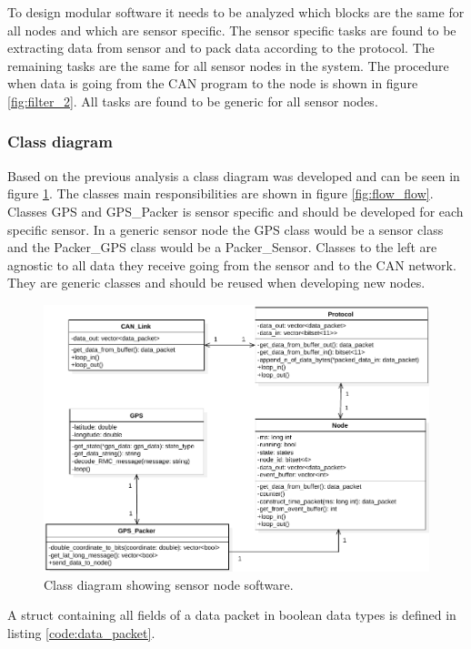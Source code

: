 To design modular software it needs to be analyzed which blocks are the same for all nodes and which are sensor specific.
The sensor specific tasks are found to be extracting data from sensor and to pack data according to the protocol.
The remaining tasks are the same for all sensor nodes in the system. 
The procedure when data is going from the CAN program to the node is shown in figure \ref{fig:filter_2}.
All tasks are found to be generic for all sensor nodes.

\subsubsection*{Class diagram}
Based on the previous analysis a class diagram was developed and can be seen in figure \ref{fig:node_class_diagram}.
The classes main responsibilities are shown in figure \ref{fig:flow_flow}.
Classes GPS and GPS\_Packer is sensor specific and should be developed for each specific sensor.
In a generic sensor node the GPS class would be a sensor class and the Packer\_GPS class would be a Packer\_Sensor. 
Classes to the left are agnostic to all data they receive going from the sensor and to the CAN network.
They are generic classes and should be reused when developing new nodes.

\begin{figure}[!h]
\centering
\includegraphics[width=1\textwidth]{graphics/ClassDiagram_NodeSimple}
\caption{Class diagram showing sensor node software.}
\label{fig:node_class_diagram}
\end{figure}

A struct containing all fields of a data packet in boolean data types is defined in listing \ref{code:data_packet}.  

